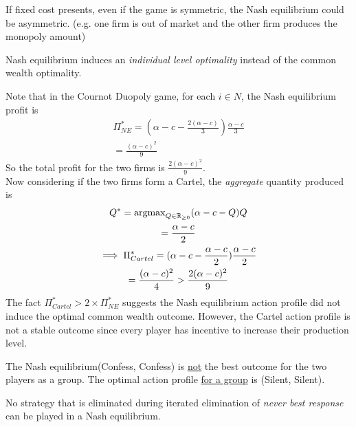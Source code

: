 \documentclass[11pt]{article}
\begin{document}
\begin{example}
			\begin{remark}
				If fixed cost presents, even if the game is symmetric, the Nash equilibrium could be asymmetric. (e.g. one firm is out of market and the other firm produces the monopoly amount)
			\end{remark}
		\end{example}
		
		\begin{remark}
			Nash equilibrium induces an \emph{individual level optimality} instead of the common wealth optimality.
		\end{remark}
		
		\begin{example}
			Note that in the Cournot Duopoly game, for each $i \in N$, the Nash equilibrium profit is
			\begin{gather}
				\Pi_{NE}^* = (\alpha - c - \frac{2(\alpha - c)}{3}) \frac{\alpha - c}{3} \\
				= \frac{(\alpha - c)^2}{9}
			\end{gather}
			So the total profit for the two firms is $\frac{2(\alpha - c)^2}{9}$. \\
			Now considering if the two firms form a Cartel, the \emph{aggregate} quantity produced is
			\begin{gather}
				Q^* = \text{{argmax}}_{Q \in \mathbb{R}_{\geq 0}} (\alpha - c - Q) Q \\
				= \frac{\alpha - c}{2} \\
				\implies \Pi_{Cartel}^* = (\alpha - c - \frac{\alpha - c}{2}) \frac{\alpha - c}{2} \\
				= \frac{(\alpha - c)^2}{4} > \frac{2(\alpha - c)^2}{9}
			\end{gather}
			The fact $\Pi_{Cartel}^* > 2 \times \Pi_{NE}^*$ suggests the Nash equilibrium action profile did not induce the optimal common wealth outcome. However, the Cartel action profile is not a stable outcome since every player has incentive to increase their production level.
		\end{example}
		
		\begin{example}
			The Nash equilibrium(Confess, Confess) is \ul{not} the best outcome for the two players as a group. The optimal action profile \ul{for a group} is (Silent, Silent).
		\end{example}
		
		\begin{proposition}
			No strategy that is eliminated during iterated elimination of \emph{never best response} can be played in a Nash equilibrium.
		\end{proposition}
	
\end{document}

